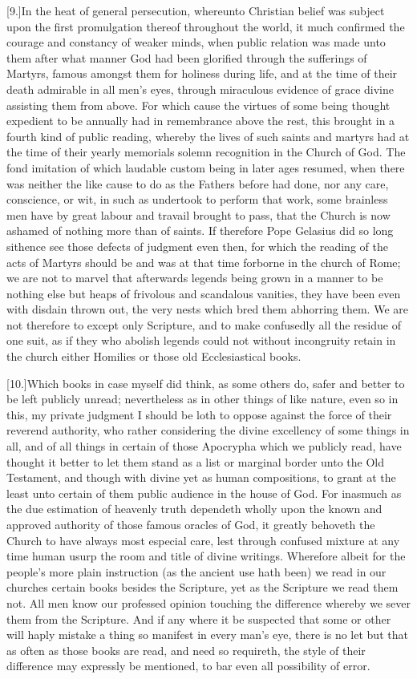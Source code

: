 [9.]In the heat of general persecution, whereunto Christian belief was subject upon the first promulgation thereof throughout the world, it much confirmed the courage and constancy of weaker minds, when public relation was made unto them after what manner God had been glorified through the sufferings of Martyrs, famous amongst them for holiness during life, and at the time of their death admirable in all men’s eyes, through miraculous evidence of grace divine assisting them from above. For which cause the virtues of some being thought expedient to be annually had in remembrance above the rest, this brought in a fourth kind of public reading, whereby the lives of such saints and martyrs had at the time of their yearly memorials solemn recognition in the Church of God. The fond imitation of which laudable custom being in later ages resumed, when there was neither the like cause to do as the Fathers before had done, nor any care, conscience, or wit, in such as undertook to perform that work, some brainless men have by great labour and travail brought to pass, that the Church is now ashamed of nothing more than of saints. If therefore Pope Gelasius did so long sithence see  those defects of judgment even then, for which the reading of the acts of Martyrs should be and was at that time forborne in the church of Rome;
 we are not to marvel that afterwards legends being grown in a manner to be nothing else but heaps of frivolous and scandalous vanities, they have been even with disdain thrown out, the very nests which bred them abhorring them. We are not therefore to except only Scripture, and to make confusedly all the residue of one suit, as if they who abolish legends could not without incongruity retain in the church either Homilies or those old Ecclesiastical books.

[10.]Which books in case myself did think, as some others do, safer and better to be left publicly unread; nevertheless as in other things of like nature, even so in this, my private judgment I should be loth to oppose against the force of their reverend authority, who rather considering the divine excellency of some things in all, and of all things in certain of those Apocrypha which we publicly read, have thought it  better to let them stand as a list or marginal border unto the Old Testament,
 and though with divine yet as human compositions, to grant at the least unto certain of them public audience in the house of God. For inasmuch as the due estimation of heavenly truth dependeth wholly upon the known and approved authority of those famous oracles of God, it greatly behoveth the Church to have always most especial care, lest through confused mixture at any time human usurp the room and title of divine writings. Wherefore albeit for the people’s more plain instruction (as the ancient use hath been) we read in our churches certain books besides the Scripture, yet as the Scripture we read them not. All men know our professed opinion touching the difference whereby we sever them from the Scripture. And if any where it be suspected that some or other will haply mistake a thing so manifest in every man’s eye, there is no let but that as often as those books are read, and need so requireth, the style of their difference may expressly be mentioned, to bar even all possibility of error.

